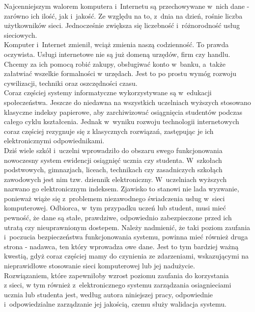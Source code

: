 \documentclass[brudnopis]{xmgr}
\begin{document}
\indent \indent \textcolor{wa}{Najcenniejszym walorem komputera i~Internetu są przechowywane w~nich dane - zarówno
ich ilość, jak i~jakość. Ze względu na to, z~dnia na dzień, rośnie liczba
użytkowników sieci. Jednocześnie zwiększa się liczebność i~różnorodność usług
sieciowych.}
\\
\indent \textcolor{wa}{Komputer i~Internet zmienił, wciąż zmienia naszą codzienność. To prawda oczywista.
Usługi internetowe nie są już domeną urzędów, firm czy handlu. Chcemy za ich pomocą
robić zakupy, obsługiwać konto w~banku, a~także załatwiać wszelkie formalności w
urzędach. Jest to po prostu wymóg rozwoju cywilizacji, techniki oraz oszczędności
czasu.}
\\
\indent \textcolor{wa}{Coraz częściej systemy informatyczne wykorzystywane są w~edukacji społeczeństwa.
Jeszcze do niedawna na wszystkich uczelniach wyższych stosowano klasyczne indeksy
papierowe, aby zarchiwizować osiągnięcia studentów podczas całego cyklu kształcenia.
Jednak w~wyniku rozwoju technologii internetowych coraz częściej rezygnuje się
z klasycznych rozwiązań, zastępując je ich elektronicznymi odpowiednikami.}
\\
\indent \textcolor{wb}{Dziś wiele szkół i~uczelni wprowadziło do obszaru swego funkcjonowania nowoczesny
system ewidencji osiągnięć ucznia czy studenta. W~szkołach podstwowych, gimnazjach,
liceach, technikach czy zasadniczych szkołąch zawodowych jest nim tzw. dziennik
elektroniczny. W~uczelniach wyższych  nazwano go elektronicznym indeksem. Zjawisko
to stanowi nie lada wyzwanie, ponieważ wiąże się z~problemem niezawodnego świadczenia
usług w~sieci komputerowej. Odbiorca, w~tym przypadku uczeń lub student, musi mieć
pewność, że dane są stałe, prawdziwe, odpowiednio zabezpieczone przed ich utratą
czy nieuprawnionym dostepem. Należy nadmienić, że taki poziom zaufania i~poczucia
bezpieczeństwa funkcjonowania systemu, powinna mieć również druga strona - nadawca,
ten który wprowadza owe dane. Jest to tym bardziej ważną kwestią, gdyż coraz częściej
mamy do czynienia ze zdarzeniami, wskazującymi na nieprawidłowe stosowanie sieci
komputerowej lub jej nadużycie.}
\\
\indent \textcolor{wa}{Rozwiązaniem, które zapewniłoby wzrost poziomu zaufania do korzystania
\\
z sieci,
w tym również z~elektronicznego systemu zarządzania osiagnieciami ucznia lub studenta
jest, według autora niniejszej pracy, odpowiednie i~odpowiedzialne zarządzanie jej
jakością, czemu służy walidacja systemu.}
\\
\end{document}
